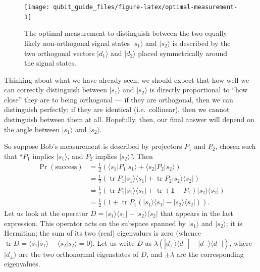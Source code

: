 \documentclass[fleqn,a4paper]{article}
\theoremstyle{definition}
\theoremstyle{definition}
\theoremstyle{definition}
\theoremstyle{definition}
\theoremstyle{remark}
\begin{document}
\begin{figure}[H]

{\centering \texttt{[image: qubit\_guide\_files/figure-latex/optimal-measurement-1]} 

}

\caption{The optimal measurement to distinguish between the two equally likely non-orthogonal signal states \(|s_1\rangle\) and \(|s_2\rangle\) is described by the two orthogonal vectors \(|d_1\rangle\) and \(|d_2\rangle\) placed symmetrically around the signal states.}\label{fig:optimal-measurement}
\end{figure}

Thinking about what we have already seen, we should expect that how well we can correctly distinguish between \(|s_1\rangle\) and \(|s_2\rangle\) is directly proportional to ``how close'' they are to being orthogonal --- if they are orthogonal, then we can distinguish perfectly; if they are identical (i.e.~collinear), then we cannot distinguish between them at all.
Hopefully, then, our final answer will depend on the angle between \(|s_1\rangle\) and \(|s_2\rangle\).

So suppose Bob's measurement is described by projectors \(P_1\) and \(P_2\), chosen such that ``\(P_1\) implies \(|s_1\rangle\), and \(P_2\) implies \(|s_2\rangle\)''.
Then
\[
  \begin{aligned}
    \Pr(\text{success})
    &= \frac{1}{2}\left(
        \langle s_1|P_1|s_1\rangle + \langle s_2|P_2|s_2\rangle
      \right)
  \\&= \frac{1}{2}\left(
        \operatorname{tr}P_1|s_1\rangle\langle s_1| + \operatorname{tr}P_2|s_2\rangle\langle s_2|
      \right)
  \\&= \frac{1}{2}\left(
        \operatorname{tr}P_1|s_1\rangle\langle s_1| + \operatorname{tr}(\mathbf{1}-P_1)|s_2\rangle\langle s_2|
      \right)
  \\&= \frac{1}{2}\left(
        1 + \operatorname{tr}P_1\left( |s_1\rangle\langle s_1| - |s_2\rangle\langle s_2| \right)
      \right).
\end{aligned}
\]
Let us look at the operator \(D = |s_1\rangle\langle s_1| - |s_2\rangle\langle s_2|\) that appears in the last expression.
This operator acts on the subspace spanned by \(|s_1\rangle\) and \(|s_2\rangle\); it is Hermitian; the sum of its two (real) eigenvalues is zero (whence \(\operatorname{tr}D=\langle s_1|s_1\rangle-\langle s_2|s_2\rangle=0\)).
Let us write \(D\) as \(\lambda(|d_+\rangle\langle d_+| - |d_-\rangle\langle d_-|)\), where \(|d_\pm\rangle\) are the two orthonormal eigenstates of \(D\), and \(\pm\lambda\) are the corresponding eigenvalues.
\end{document}
